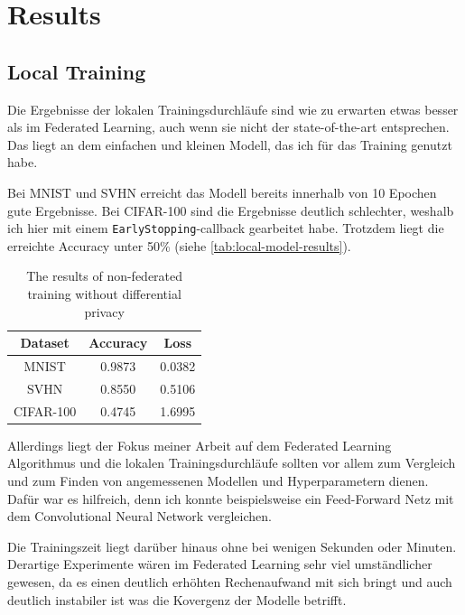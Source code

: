 \chapter{Results}

\section{Local Training} \label{sec:local-training-results}

Die Ergebnisse der lokalen Trainingsdurchläufe sind wie zu erwarten etwas besser als im Federated Learning, auch wenn sie nicht der state-of-the-art entsprechen. Das liegt an dem einfachen und kleinen Modell, das ich für das Training genutzt habe.

Bei MNIST und SVHN erreicht das Modell bereits innerhalb von 10 Epochen gute Ergebnisse. Bei CIFAR-100 sind die Ergebnisse deutlich schlechter, weshalb ich hier mit einem \texttt{EarlyStopping}-callback gearbeitet habe. Trotzdem liegt die erreichte Accuracy unter 50\% (siehe \autoref{tab:local-model-results}).

\begin{table}
	\centering
	\begin{tabular}{|c|c|c|}
		\hline
		Dataset & Accuracy & Loss \\
		\hline
		MNIST & 0.9873 & 0.0382 \\
		SVHN & 0.8550 & 0.5106 \\
		CIFAR-100 & 0.4745 & 1.6995 \\
		\hline
	\end{tabular}
	\caption{The results of non-federated training without differential privacy}
	\label{tab:local-model-results}
\end{table}

Allerdings liegt der Fokus meiner Arbeit auf dem Federated Learning Algorithmus und die lokalen Trainingsdurchläufe sollten vor allem zum Vergleich und zum Finden von angemessenen Modellen und Hyperparametern dienen. Dafür war es hilfreich, denn ich konnte beispielsweise ein Feed-Forward Netz mit dem Convolutional Neural Network vergleichen. 

Die Trainingszeit liegt darüber hinaus ohne bei wenigen Sekunden oder Minuten. Derartige Experimente wären im Federated Learning sehr viel umständlicher gewesen, da es einen deutlich erhöhten Rechenaufwand mit sich bringt und auch deutlich instabiler ist was die Kovergenz der Modelle betrifft.

